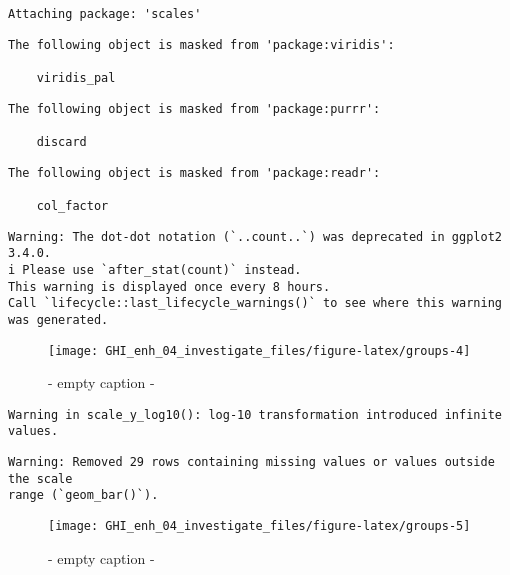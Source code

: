 \documentclass[
  10pt,
  a4paper,oneside]{article}
\begin{document}
\begin{verbatim}
Attaching package: 'scales'
\end{verbatim}

\begin{verbatim}
The following object is masked from 'package:viridis':

    viridis_pal
\end{verbatim}

\begin{verbatim}
The following object is masked from 'package:purrr':

    discard
\end{verbatim}

\begin{verbatim}
The following object is masked from 'package:readr':

    col_factor
\end{verbatim}

\begin{verbatim}
Warning: The dot-dot notation (`..count..`) was deprecated in ggplot2 3.4.0.
i Please use `after_stat(count)` instead.
This warning is displayed once every 8 hours.
Call `lifecycle::last_lifecycle_warnings()` to see where this warning was generated.
\end{verbatim}

\begin{figure}[H]

{\centering \texttt{[image: GHI\_enh\_04\_investigate\_files/figure-latex/groups-4]} 

}

\caption{ - empty caption - }\label{fig:groups-4}
\end{figure}

\begin{verbatim}
Warning in scale_y_log10(): log-10 transformation introduced infinite values.
\end{verbatim}

\begin{verbatim}
Warning: Removed 29 rows containing missing values or values outside the scale
range (`geom_bar()`).
\end{verbatim}

\begin{figure}[H]

{\centering \texttt{[image: GHI\_enh\_04\_investigate\_files/figure-latex/groups-5]} 

}

\caption{ - empty caption - }\label{fig:groups-5}
\end{figure}
\end{document}
